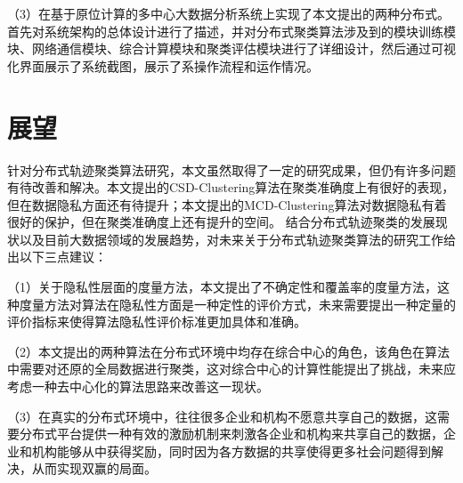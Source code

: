 （3）在基于原位计算的多中心大数据分析系统上实现了本文提出的两种分布式。首先对系统架构的总体设计进行了描述，并对分布式聚类算法涉及到的模块训练模块、网络通信模块、综合计算模块和聚类评估模块进行了详细设计，然后通过可视化界面展示了系统截图，展示了系操作流程和运作情况。

\section{展望}

针对分布式轨迹聚类算法研究，本文虽然取得了一定的研究成果，但仍有许多问题有待改善和解决。本文提出的CSD-Clustering算法在聚类准确度上有很好的表现，但在数据隐私方面还有待提升；本文提出的MCD-Clustering算法对数据隐私有着很好的保护，但在聚类准确度上还有提升的空间。
结合分布式轨迹聚类的发展现状以及目前大数据领域的发展趋势，对未来关于分布式轨迹聚类算法的研究工作给出以下三点建议：

（1）关于隐私性层面的度量方法，本文提出了不确定性和覆盖率的度量方法，这种度量方法对算法在隐私性方面是一种定性的评价方式，未来需要提出一种定量的评价指标来使得算法隐私性评价标准更加具体和准确。

（2）本文提出的两种算法在分布式环境中均存在综合中心的角色，该角色在算法中需要对还原的全局数据进行聚类，这对综合中心的计算性能提出了挑战，未来应考虑一种去中心化的算法思路来改善这一现状。

（3）在真实的分布式环境中，往往很多企业和机构不愿意共享自己的数据，这需要分布式平台提供一种有效的激励机制来刺激各企业和机构来共享自己的数据，企业和机构能够从中获得奖励，同时因为各方数据的共享使得更多社会问题得到解决，从而实现双赢的局面。


